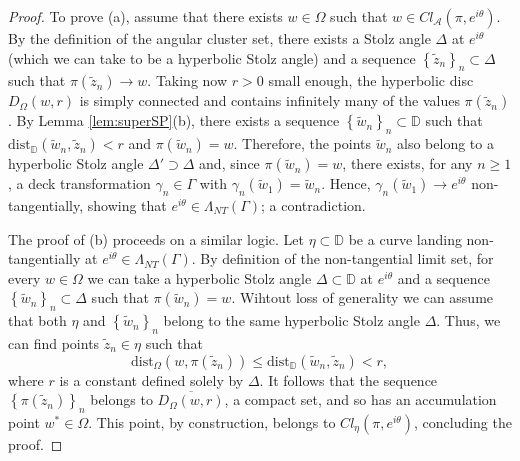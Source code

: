 \documentclass[11pt,a4paper,reqno]{amsart}
\theoremstyle{plain}
\theoremstyle{definition}
\theoremstyle{plain}
\def\DD{\mathbb{D}}
\def\A{\mathcal{A}}
\renewcommand{\tilde}{\widetilde}
\begin{document}
\begin{proof}
	To prove (a), assume that there exists $w\in\Omega$ such that $w\in Cl_\A(\pi, e^{i\theta})$. By the definition of the angular cluster set, there exists a Stolz angle $\Delta$ at $ e^{i\theta} $ (which we can take to be a hyperbolic Stolz angle) and a sequence $\left\lbrace \tilde z_n\right\rbrace _{n}\subset \Delta$ such that $\pi(\tilde z_n)\to w$. Taking now $r > 0$ small enough, the hyperbolic disc $D_\Omega(w, r)$ is simply connected and contains infinitely many of the values $\pi(\tilde z_n)$. By Lemma \ref{lem:superSP}(b), there exists a sequence $\left\lbrace \tilde w_n\right\rbrace _n\subset\DD$ such that  $ \textrm{dist}_\mathbb{D}(\tilde w_n, \tilde z_n)<r $ and $\pi(\tilde w_n) = w$. Therefore, the points $\tilde w_n$ also belong to a hyperbolic Stolz angle $\Delta'\supset \Delta$ and, since $\pi(\tilde w_n) = w$, there exists, for any $n\geq 1$, a deck transformation $ \gamma_n \in \Gamma$ with $ \gamma_n(\tilde w_1) = \tilde w_n$. Hence, $ \gamma_n(\tilde w_1)\to e^{i\theta} $ non-tangentially, showing that $e^{i\theta}\in \Lambda_{NT}(\Gamma)$; a contradiction.

	The proof of (b) proceeds on a similar logic. Let $\eta\subset\DD$ be a curve landing non-tangentially at $e^{i\theta}\in \Lambda_{NT}(\Gamma)$. By definition of the non-tangential limit set, for every $w\in \Omega$ we can take a hyperbolic Stolz angle $\Delta\subset\DD$ at $e^{i\theta}$ and a sequence $\left\lbrace \tilde w_n\right\rbrace _n\subset\Delta$ such that $\pi(\tilde w_n) = w$. Wihtout loss of generality we can assume that both $\eta$ and $\left\lbrace \tilde w_n\right\rbrace _n$ belong to the same hyperbolic Stolz angle $\Delta$. Thus, we can find points $\tilde z_n\in \eta$ such that $$\textrm{dist}_\Omega(w, \pi(\tilde z_n)) \leq \textrm{dist}_\DD(\tilde w_n, \tilde z_n) < r,$$ where $r$ is a constant defined solely by $\Delta$. It follows that the sequence $\left\lbrace \pi(\tilde z_n)\right\rbrace _n$ belongs to $\overline{D_\Omega(w, r)}$, a compact set, and so has an accumulation point $w^*\in \Omega$. This point, by construction, belongs to $Cl _\eta(\pi, e^{i\theta})$, concluding the proof. 
\end{proof}
\end{document}
